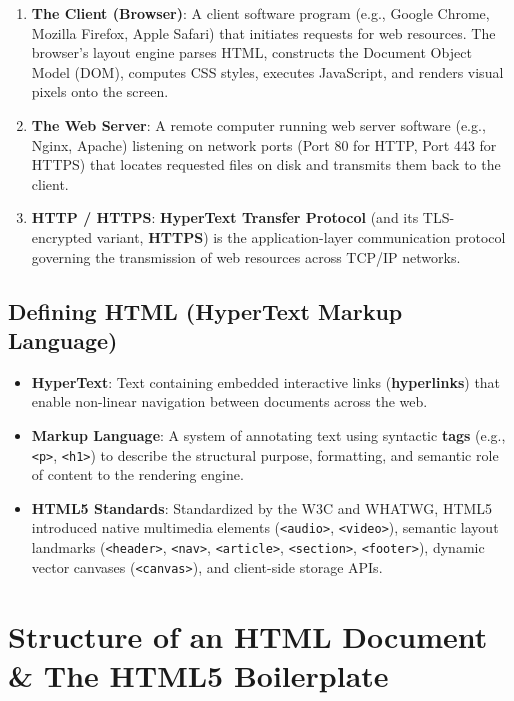 \begin{enumerate}[leftmargin=1.5em]
    \item \textbf{The Client (Browser)}: A client software program (e.g., Google Chrome, Mozilla Firefox, Apple Safari) that initiates requests for web resources. The browser's layout engine parses HTML, constructs the Document Object Model (DOM), computes CSS styles, executes JavaScript, and renders visual pixels onto the screen.
    \item \textbf{The Web Server}: A remote computer running web server software (e.g., Nginx, Apache) listening on network ports (Port 80 for HTTP, Port 443 for HTTPS) that locates requested files on disk and transmits them back to the client.
    \item \textbf{HTTP / HTTPS}: \textbf{HyperText Transfer Protocol} (and its TLS-encrypted variant, \textbf{HTTPS}) is the application-layer communication protocol governing the transmission of web resources across TCP/IP networks.
\end{enumerate}

\subsection{Defining HTML (HyperText Markup Language)}
\begin{itemize}[leftmargin=1.5em]
    \item \textbf{HyperText}: Text containing embedded interactive links (\textbf{hyperlinks}) that enable non-linear navigation between documents across the web.
    \item \textbf{Markup Language}: A system of annotating text using syntactic \textbf{tags} (e.g., \texttt{<p>}, \texttt{<h1>}) to describe the structural purpose, formatting, and semantic role of content to the rendering engine.
    \item \textbf{HTML5 Standards}: Standardized by the W3C and WHATWG, HTML5 introduced native multimedia elements (\texttt{<audio>}, \texttt{<video>}), semantic layout landmarks (\texttt{<header>}, \texttt{<nav>}, \texttt{<article>}, \texttt{<section>}, \texttt{<footer>}), dynamic vector canvases (\texttt{<canvas>}), and client-side storage APIs.
\end{itemize}

\section{Structure of an HTML Document \& The HTML5 Boilerplate}

